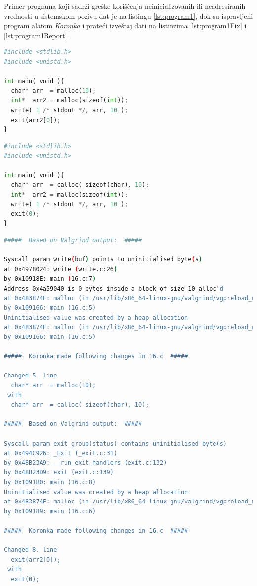 \documentclass[12pt,oneside]{memoir}
\theoremstyle{plain}
\theoremstyle{definition}
\begin{document}
\newpage
Primer programa koji sadrži greške korišćenja neinicializovanih ili neadresiranih vrednosti u sistemskom pozivu dat je na listingu \ref{lst:program1}, dok su ispravljeni program alatom \textit{Koronka} i prateći izveštaj dati na listinzima \ref{lst:program1Fix} i \ref{lst:program1Report}.

\begin{lstlisting}[style=mystyle,caption={Program koji sadrži greške korišćenja neinicializovanih ili neadresiranih vrednosti u sistemskom pozivu}, label={lst:program1},language={Python}] 
#include <stdlib.h>
#include <unistd.h>

int main( void ){
  char* arr  = malloc(10);
  int*  arr2 = malloc(sizeof(int));
  write( 1 /* stdout */, arr, 10 );
  exit(arr2[0]);
}
\end{lstlisting}

\begin{lstlisting}[style=mystyle,caption={Ispravljeni program sa listinga \ref{lst:program1} alatom \textit{Koronka}}, label={lst:program1Fix},language={Python}] 
#include <stdlib.h>
#include <unistd.h>

int main( void ){
  char* arr  = calloc( sizeof(char), 10);
  int*  arr2 = malloc(sizeof(int));
  write( 1 /* stdout */, arr, 10 );
  exit(0);
}
\end{lstlisting}

\begin{lstlisting}[style=terminal,caption={Izveštaj o radu alata \textit{Koronka} za program sa listinga \ref{lst:program1}}, label={lst:program1Report},language={bash}]   
#####  Based on Valgrind output:  #####

Syscall param write(buf) points to uninitialised byte(s)
at 0x4978024: write (write.c:26)
by 0x10918E: main (16.c:7)
Address 0x4a59040 is 0 bytes inside a block of size 10 alloc'd
at 0x483874F: malloc (in /usr/lib/x86_64-linux-gnu/valgrind/vgpreload_memcheck-amd64-linux.so)
by 0x109166: main (16.c:5)
Uninitialised value was created by a heap allocation
at 0x483874F: malloc (in /usr/lib/x86_64-linux-gnu/valgrind/vgpreload_memcheck-amd64-linux.so)
by 0x109166: main (16.c:5)

#####  Koronka made following changes in 16.c  #####

Changed 5. line 
  char* arr  = malloc(10);
 with 
  char* arr  = calloc( sizeof(char), 10);

#####  Based on Valgrind output:  #####

Syscall param exit_group(status) contains uninitialised byte(s)
at 0x494C926: _Exit (_exit.c:31)
by 0x48B23A9: __run_exit_handlers (exit.c:132)
by 0x48B23D9: exit (exit.c:139)
by 0x1091B0: main (16.c:8)
Uninitialised value was created by a heap allocation
at 0x483874F: malloc (in /usr/lib/x86_64-linux-gnu/valgrind/vgpreload_memcheck-amd64-linux.so)
by 0x109189: main (16.c:6)

#####  Koronka made following changes in 16.c  #####

Changed 8. line 
  exit(arr2[0]);
 with 
  exit(0);
\end{lstlisting}
\end{document}
